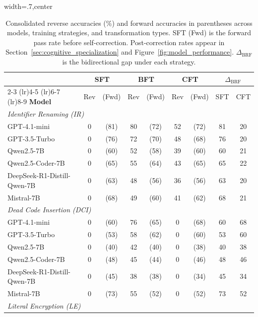 \begin{table}[tb]
\centering
\caption{Consolidated reverse accuracies (\%) and forward accuracies in
parentheses across models, training strategies, and transformation types.
SFT (Fwd) is the forward pass rate before self-correction.
Post-correction rates appear in Section~\ref{sec:cognitive_specialization}
and Figure~\ref{fig:model_performance}.
$\Delta_{\text{BRF}}$ is the bidirectional gap under each strategy.}
\begin{adjustbox}{width=.7\columnwidth,center}
\label{tab:consolidated_results}
\begin{tabular}{@{}l cc cc cc cc@{}}
\toprule
& \multicolumn{2}{c}{\textbf{SFT}} & \multicolumn{2}{c}{\textbf{BFT}} & \multicolumn{2}{c}{\textbf{CFT}} & \multicolumn{2}{c}{$\Delta_{\text{BRF}}$} \\
\cmidrule(lr){2-3} \cmidrule(lr){4-5} \cmidrule(lr){6-7} \cmidrule(lr){8-9}
\textbf{Model} & Rev & (Fwd) & Rev & (Fwd) & Rev & (Fwd) & SFT & CFT \\
\midrule
\multicolumn{9}{l}{\textit{Identifier Renaming (IR)}} \\
\midrule
GPT-4.1-mini & 0 & (81) & 80 & (72) & 52 & (72) & 81 & 20 \\
GPT-3.5-Turbo & 0 & (76) & 72 & (70) & 48 & (68) & 76 & 20 \\
Qwen2.5-7B & 0 & (60) & 52 & (58) & 39 & (60) & 60 & 21 \\
Qwen2.5-Coder-7B & 0 & (65) & 55 & (64) & 43 & (65) & 65 & 22 \\
DeepSeek-R1-Distill-Qwen-7B & 0 & (63) & 48 & (56) & 36 & (56) & 63 & 20 \\
Mistral-7B & 0 & (68) & 49 & (60) & 41 & (62) & 68 & 21 \\
\midrule
\multicolumn{9}{l}{\textit{Dead Code Insertion (DCI)}} \\
\midrule
GPT-4.1-mini & 0 & (60) & 76 & (65) & 0 & (68) & 60 & 68 \\
GPT-3.5-Turbo & 0 & (53) & 58 & (62) & 0 & (60) & 53 & 60 \\
Qwen2.5-7B & 0 & (40) & 42 & (40) & 0 & (38) & 40 & 38 \\
Qwen2.5-Coder-7B & 0 & (48) & 45 & (44) & 0 & (46) & 48 & 46 \\
DeepSeek-R1-Distill-Qwen-7B & 0 & (45) & 38 & (38) & 0 & (34) & 45 & 34 \\
Mistral-7B & 0 & (73) & 55 & (52) & 0 & (52) & 73 & 52 \\
\midrule
\multicolumn{9}{l}{\textit{Literal Encryption (LE)}} \\

\end{tabular}
\end{adjustbox}
\end{table}
